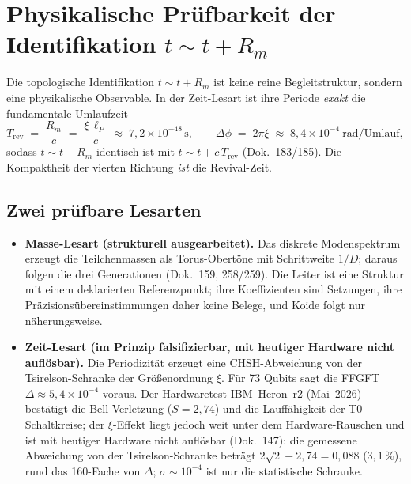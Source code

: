 \section{Physikalische Pr\"ufbarkeit der Identifikation $t\sim t+R_m$}

Die topologische Identifikation $t \sim t + R_m$ ist keine reine
Begleitstruktur, sondern eine physikalische Observable. In der Zeit-Lesart ist
ihre Periode \emph{exakt} die fundamentale Umlaufzeit
\[
  T_\text{rev} \;=\; \frac{R_m}{c} \;=\; \frac{\xi\,\ell_P}{c}
  \;\approx\; 7{,}2\times10^{-48}\,\text{s},
  \qquad
  \Delta\phi \;=\; 2\pi\xi \;\approx\; 8{,}4\times10^{-4}\ \text{rad/Umlauf},
\]
sodass $t\sim t+R_m$ identisch ist mit $t\sim t+c\,T_\text{rev}$ (Dok.~183/185).
Die Kompaktheit der vierten Richtung \emph{ist} die Revival-Zeit.

\subsection{Zwei pr\"ufbare Lesarten}
\begin{itemize}
  \item \textbf{Masse-Lesart (strukturell ausgearbeitet).} Das diskrete Modenspektrum
  erzeugt die Teilchenmassen als Torus-Obert\"one mit Schrittweite $1/D$; daraus
  folgen die drei Generationen (Dok.~159, 258/259). Die Leiter ist eine Struktur mit
  einem deklarierten Referenzpunkt; ihre Koeffizienten sind Setzungen, ihre
  Pr\"azisions\"ubereinstimmungen daher keine Belege, und Koide folgt nur
  n\"aherungsweise.
  \item \textbf{Zeit-Lesart (im Prinzip falsifizierbar, mit heutiger Hardware nicht aufl\"osbar).} Die
  Periodizit\"at erzeugt eine CHSH-Abweichung von der Tsirelson-Schranke der
  Gr\"o\ss enordnung $\xi$. F\"ur 73 Qubits sagt die FFGFT
  $\Delta \approx 5{,}4\times10^{-4}$ voraus. Der Hardwaretest IBM~Heron~r2 (Mai~2026) best\"atigt die
  Bell-Verletzung ($S=2{,}74$) und die Lauff\"ahigkeit der T0-Schaltkreise; der
  $\xi$-Effekt liegt jedoch weit unter dem Hardware-Rauschen und ist mit heutiger Hardware nicht
  aufl\"osbar (Dok.~147): die gemessene Abweichung von der Tsirelson-Schranke
  betr\"agt $2\sqrt2-2{,}74=0{,}088$ ($3{,}1\,\%$), rund das 160-Fache von $\Delta$;
  $\sigma\sim10^{-4}$ ist nur die statistische Schranke.
\end{itemize}


